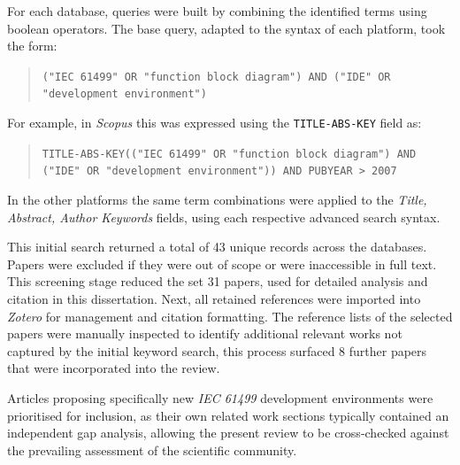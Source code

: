 For each database, queries were built by combining the identified terms using boolean operators. The base query, adapted to the syntax of each platform, took the form:

\begin{quote}
\texttt{("IEC 61499" OR "function block diagram") AND ("IDE" OR "development environment")}
\end{quote}

For example, in \textit{Scopus} this was expressed using the \texttt{TITLE-ABS-KEY} field as:

\begin{quote}
\texttt{TITLE-ABS-KEY(("IEC 61499" OR "function block diagram") AND ("IDE" OR "development environment")) AND PUBYEAR > 2007}
\end{quote}

In the other platforms the same term combinations were applied to the \textit{Title, Abstract, Author Keywords} fields, using each respective advanced search syntax.

This initial search returned a total of 43 unique records across the databases. Papers were excluded if they were out of scope or were inaccessible in full text. This screening stage reduced the set 31 papers, used for detailed analysis and citation in this dissertation. Next, all retained references were imported into \textit{Zotero} for management and citation formatting. The reference lists of the selected papers were manually inspected to identify additional relevant works not captured by the initial keyword search, this process surfaced 8 further papers that were incorporated into the review.

Articles proposing specifically new \textit{IEC 61499} development environments were prioritised for inclusion, as their own related work sections typically contained an independent gap analysis, allowing the present review to be cross-checked against the prevailing assessment of the scientific community.

